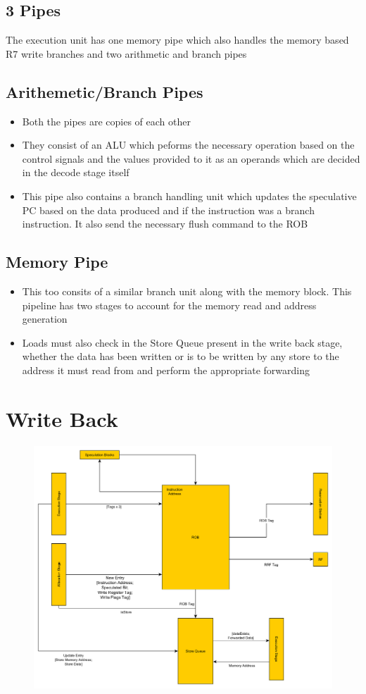 \documentclass{article}
\begin{document}
\subsection{3 Pipes}
The execution unit has one memory pipe which also handles the memory based R7 write branches and two arithmetic and branch pipes
\subsection{Arithemetic/Branch Pipes}
\begin{itemize}
\item Both the pipes are copies of each other
\item They consist of an ALU which peforms the necessary operation based on the control signals and the values provided to it as an operands which are decided in the decode stage itself
\item This pipe also contains a branch handling unit which updates the speculative PC based on the data produced and if the instruction was a branch instruction. It also send the necessary flush command to the ROB
\end{itemize}
\subsection{Memory Pipe}
\begin{itemize}
\item This too consits of a similar branch unit along with the memory block. This pipeline has two stages to account for the memory read and address generation
\item Loads must also check in the Store Queue present in the write back stage, whether the data has been written or is to be written by any store to the address it must read from and perform the appropriate forwarding
\end{itemize}

\section{Write Back}
\begin{figure}[H]
	\centering
	\includegraphics[scale = 0.43]{../GraphImages/writeBack_stage.png}
\end{figure}
\end{document}

